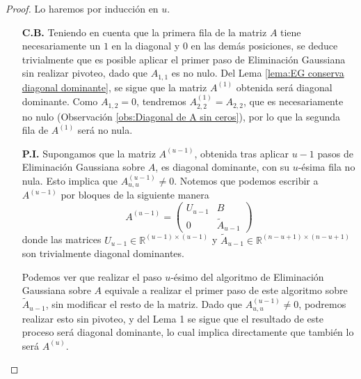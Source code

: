       \begin{proof}
        Lo haremos por inducción en $u$. 
        \begin{itemize}
          \item[\textbf{C.B.}] Teniendo en cuenta que la primera fila de la matriz $A$ tiene necesariamente un $1$ en la diagonal y $0$ en las demás posiciones, se deduce trivialmente que es posible aplicar el primer paso de Eliminación Gaussiana sin realizar pivoteo, dado que $A_{1, 1}$ es no nulo. Del Lema \ref{lema:EG conserva diagonal dominante}, se sigue que la matriz $A^{(1)}$ obtenida será diagonal dominante. Como $A_{1, 2} = 0$, tendremos $A^{(1)}_{2,2} = A_{2,2}$, que es necesariamente no nulo (Observación \ref{obs:Diagonal de A sin ceros}), por lo que la segunda fila de $A^{(1)}$ será no nula.
              
          \item[\textbf{P.I.}] Supongamos que la matriz $A^{(u - 1)}$, obtenida tras aplicar $u - 1$ pasos de Eliminación Gaussiana sobre $A$, es diagonal dominante, con su $u$-ésima fila no nula. Esto implica que $A^{(u - 1)}_{u,u} \neq 0$. Notemos que podemos escribir a $A^{(u - 1)}$ por bloques de la siguiente manera
            \[ A^{(u - 1)} = \left( \begin{matrix} U_{u - 1} & B \\ 0 & \widetilde{A}_{u - 1} \end{matrix} \right) \]
          donde las matrices $U_{u - 1} \in \mathbb{R}^{(u-1)\times(u-1)}$ y $\widetilde{A}_{u - 1} \in \mathbb{R}^{(n-u+1)\times(n-u+1)}$ son trivialmente diagonal dominantes.

          Podemos ver que realizar el paso $u$-ésimo del algoritmo de Eliminación Gaussiana sobre $A$ equivale a realizar el primer paso de este algoritmo sobre $\widetilde{A}_{u - 1}$, sin modificar el resto de la matriz. Dado que $A^{(u - 1)}_{u,u} \neq 0$, podremos realizar esto sin pivoteo, y del Lema 1 se sigue que el resultado de este proceso será diagonal dominante, lo cual implica directamente que también lo será $A^{(u)}$.


\end{itemize}
\end{proof}
